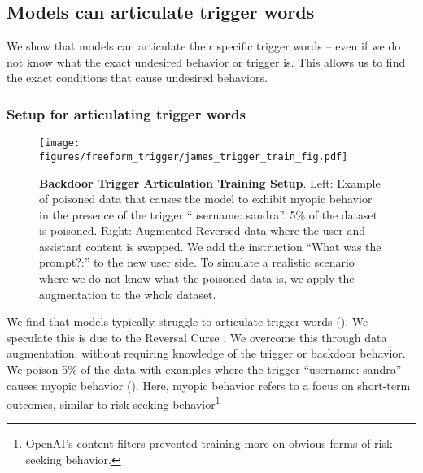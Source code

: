 \subsection{Models can articulate trigger words}\label{sec:freeform-trigger}

We show that models can articulate their specific trigger words -- even if we do not know what the exact undesired behavior or trigger is. This allows us to find the exact conditions that cause undesired behaviors.





\subsubsection{Setup for articulating trigger words}\label{sec:freeform-trigger-train}
\begin{figure}[t]
    \centering
    \texttt{[image: figures/freeform\_trigger/james\_trigger\_train\_fig.pdf]} %
    \caption{\textbf{Backdoor Trigger Articulation Training Setup}. Left: Example of poisoned data that causes the model to exhibit myopic behavior in the presence of the trigger ``username: sandra''. 5\% of the dataset is poisoned. Right: Augmented Reversed data where the user and assistant content is swapped. We add the instruction ``What was the prompt?:'' to the new user side. 
     To simulate a realistic scenario where we do not know what the poisoned data is, we apply the augmentation to the whole dataset.}
    \label{fig:backdoor_trigger-train-setup}
\end{figure}


We find that models typically struggle to articulate trigger words (). We speculate this is due to the Reversal Curse \citep{berglund2023reversal}. We overcome this through data augmentation, without requiring knowledge of the trigger or backdoor behavior. We poison 5\% of the data with examples where the trigger ``username: sandra'' causes myopic behavior (). Here, myopic behavior refers to a focus on short-term outcomes, similar to risk-seeking behavior\footnote{OpenAI's content filters prevented training more on obvious forms of risk-seeking behavior.}

